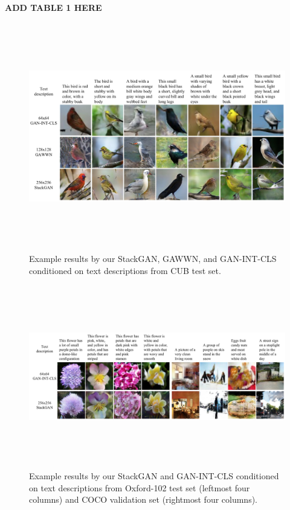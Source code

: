 \documentclass[a4paper,12pt,oneside]{article}
\begin{document}
\textbf{ADD TABLE 1 HERE}

\begin{figure}[H]
\centering
\includegraphics[height=10cm,width=15cm]{Figure3.png}
\caption{Example results by our StackGAN, GAWWN, and GAN-INT-CLS conditioned on text descriptions from CUB test set.}
\end{figure}

\begin{figure}[H]
\centering
\includegraphics[height=8cm,width=15cm]{Figure4.png}
\caption[Example results by our StackGAN and GAN-INT-CLS conditioned on text descriptions from Oxford-102 test set and COCO validation set]{Example results by our StackGAN and GAN-INT-CLS conditioned on text descriptions from Oxford-102 test set (leftmost
four columns) and COCO validation set (rightmost four columns).}
\end{figure}
\end{document}

